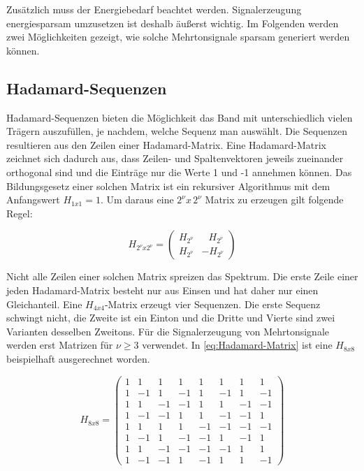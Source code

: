 Zusätzlich muss der Energiebedarf beachtet werden. Signalerzeugung energiesparsam umzusetzen ist deshalb äußerst wichtig. Im Folgenden werden zwei Möglichkeiten gezeigt, wie solche Mehrtonsignale sparsam generiert werden können. 

\subsection{Hadamard-Sequenzen}
\label{chap2.4.1:Hadamard}
Hadamard-Sequenzen bieten die Möglichkeit das Band mit unterschiedlich vielen Trägern auszufüllen, je nachdem, welche Sequenz man auswählt. Die Sequenzen resultieren aus den Zeilen einer Hadamard-Matrix. Eine Hadamard-Matrix zeichnet sich dadurch aus, dass  Zeilen- und Spaltenvektoren jeweils zueinander orthogonal sind und die Einträge nur die Werte 1 und -1 annehmen können. Das Bildungsgesetz einer solchen Matrix ist ein rekursiver Algorithmus mit dem Anfangswert $H_{1x1} = 1$. Um daraus eine $2^{\nu}x\,2^{\nu}$ Matrix zu erzeugen gilt folgende Regel: 

\begin{equation}
	\label{eq:Hadamard-Matrix}
	H_{2^{\nu} x 2^{\nu}} = 
	\begin{pmatrix}
		H_{2^{\nu}} & \;\;\,H_{2^{\nu}} \\ H_{2^{\nu}} & - H_{2^{\nu}}
	\end{pmatrix}	 
\end{equation} 

Nicht alle Zeilen einer solchen Matrix spreizen das Spektrum. Die erste Zeile einer jeden Hadamard-Matrix besteht nur aus Einsen und hat daher nur einen Gleichanteil. Eine $H_{4x4}$-Matrix erzeugt vier Sequenzen. Die erste Sequenz schwingt nicht, die Zweite ist ein Einton und die Dritte und Vierte sind zwei Varianten desselben Zweitons. Für die Signalerzeugung von Mehrtonsignale werden erst Matrizen für $\nu \geq 3$ verwendet. In \eqref{eq:Hadamard-Matrix} ist eine $H_{8x8}$ beispielhaft ausgerechnet worden. 

\begin{equation}
	\label{eq:Hadamard8x8}
	H_{8 x 8} = \begin{pmatrix}
	1&1&1&1&1&1&1&1\\
	1&-1&1&-1&1&-1&1&-1\\
	1&1&-1&-1&1&1&-1&-1\\
	1&-1&-1&1&1&-1&-1&1\\
	1&1&1&1&-1&-1&-1&-1\\
	1&-1&1&-1&-1&1&-1&1\\
	1&1&-1&-1&-1&-1&1&1\\
	1&-1&-1&1&-1&1&1&-1
	\end{pmatrix}
\end{equation}

